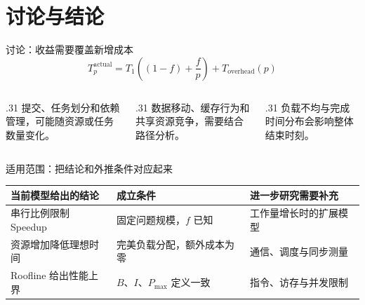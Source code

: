 \section{讨论与结论}
\begin{frame}{讨论：收益需要覆盖新增成本}
\[T_p^{\mathrm{actual}}=T_1\left((1-f)+\frac{f}{p}\right)+T_{\mathrm{overhead}}(p)\]
\vspace{3mm}
\begin{columns}[T,onlytextwidth]
\begin{column}{.31\textwidth}
提交、任务划分和依赖管理，可能随资源或任务数量变化。
\end{column}
\begin{column}{.31\textwidth}
数据移动、缓存行为和共享资源竞争，需要结合路径分析。
\end{column}
\begin{column}{.31\textwidth}
负载不均与完成时间分布会影响整体结束时刻。
\end{column}
\end{columns}
\vspace{4mm}
\end{frame}

\begin{frame}{适用范围：把结论和外推条件对应起来}
\begin{tabularx}{\textwidth}{@{}>{\raggedright\arraybackslash}p{4.1cm}XX@{}}
\toprule 当前模型给出的结论 & 成立条件 & 进一步研究需要补充 \\\midrule
串行比例限制 Speedup & 固定问题规模，$f$ 已知 & 工作量增长时的扩展模型 \\
资源增加降低理想时间 & 完美负载分配，额外成本为零 & 通信、调度与同步测量 \\
Roofline 给出性能上界 & $B$、$I$、$P_{\max}$ 定义一致 & 指令、访存与并发限制 \\
\bottomrule
\end{tabularx}
\vspace{6mm}
\end{frame}

